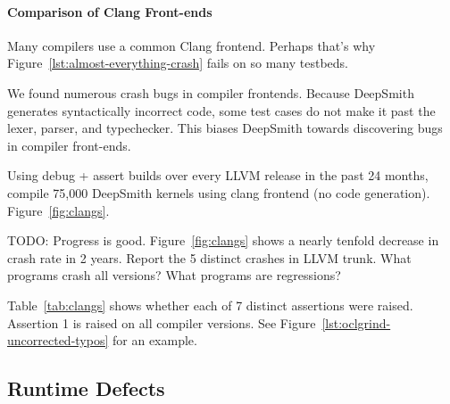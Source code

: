 \paragraph{Comparison of Clang Front-ends}%

Many compilers use a common Clang frontend. Perhaps that's why Figure~\ref{lst:almost-everything-crash} fails on so many testbeds.

We found numerous crash bugs in compiler frontends. Because DeepSmith generates syntactically incorrect code, some test cases do not make it past the lexer, parser, and typechecker. This biases DeepSmith towards discovering bugs in compiler front-ends.

Using debug + assert builds over every LLVM release in the past 24 months, compile 75,000 DeepSmith kernels using clang frontend (no code generation). Figure~\ref{fig:clangs}.

TODO: Progress is good. Figure~\ref{fig:clangs} shows a nearly tenfold decrease in crash rate in 2 years. Report the 5 distinct crashes in LLVM trunk. What programs crash all versions? What programs are regressions?

Table~\ref{tab:clangs} shows whether each of 7 distinct assertions were raised. Assertion 1 is raised on all compiler versions. See Figure~\ref{lst:oclgrind-uncorrected-typos} for an example.


\subsection{Runtime Defects}

